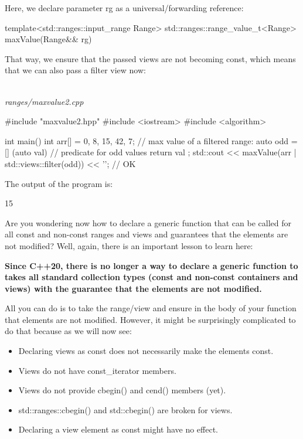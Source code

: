 Here, we declare parameter rg as a universal/forwarding reference:

\begin{cpp}
template<std::ranges::input_range Range>
std::ranges::range_value_t<Range> maxValue(Range&& rg)
\end{cpp}

That way, we ensure that the passed views are not becoming const, which means that we can also pass a filter view now:

\noindent
\hspace*{\fill} \\ %
\textit{ranges/maxvalue2.cpp}

\begin{cpp}
#include "maxvalue2.hpp"
#include <iostream>
#include <algorithm>

int main()
{
	int arr[] = {0, 8, 15, 42, 7};
	// max value of a filtered range:
	auto odd = [] (auto val) { // predicate for odd values
				return val %
			};
	std::cout << maxValue(arr | std::views::filter(odd)) << '\n'; // OK
}
\end{cpp}

The output of the program is:

{\footnotesize
\begin{shell}
15
\end{shell}
}

Are you wondering now how to declare a generic function that can be called for all const and non-const ranges and views and guarantees that the elements are not modified? Well, again, there is an important lesson to learn here:

\textbf{Since C++20, there is no longer a way to declare a generic function to takes all standard collection types (const and non-const containers and views) with the guarantee that the elements are not modified.}

All you can do is to take the range/view and ensure in the body of your function that elements are not modified. However, it might be surprisingly complicated to do that because as we will now see:

\begin{itemize}
\item
Declaring views as const does not necessarily make the elements const.

\item
Views do not have const\_iterator members.

\item
Views do not provide cbegin() and cend() members (yet).

\item
std::ranges::cbegin() and std::cbegin() are broken for views.

\item
Declaring a view element as const might have no effect.
\end{itemize}

